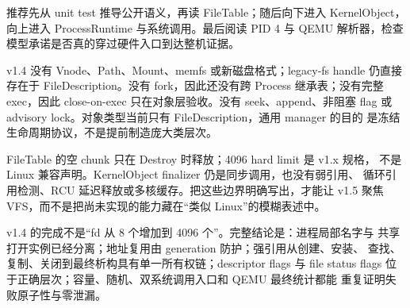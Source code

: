 推荐先从 unit test 推导公开语义，再读 FileTable；随后向下进入
KernelObject，向上进入 ProcessRuntime 与系统调用。最后阅读 PID 4 与 QEMU
解析器，检查模型承诺是否真的穿过硬件入口到达整机证据。

v1.4 没有 Vnode、Path、Mount、memfs 或新磁盘格式；legacy-fs handle 仍直接
存在于 FileDescription。没有 fork，因此还没有跨 Process 继承表；没有完整
exec，因此 close-on-exec 只在对象层验收。没有 seek、append、非阻塞 flag
或 advisory lock。对象类型当前只有 FileDescription，通用 manager 的目的
是冻结生命周期协议，不是提前制造庞大类层次。

FileTable 的空 chunk 只在 Destroy 时释放；4096 hard limit 是 v1.x 规格，
不是 Linux 兼容声明。KernelObject finalizer 仍是同步调用，也没有弱引用、
循环引用检测、RCU 延迟释放或多核缓存。把这些边界明确写出，才能让 v1.5
聚焦 VFS，而不是把尚未实现的能力藏在“类似 Linux”的模糊表述中。

\begin{keyidea}
v1.4 的完成不是“fd 从 8 个增加到 4096 个”。完整结论是：进程局部名字与
共享打开实例已经分离；地址复用由 generation 防护；强引用从创建、安装、
查找、复制、关闭到最终析构具有单一所有权链；descriptor flags 与 file
status flags 位于正确层次；容量、随机、双系统调用入口和 QEMU 最终统计都能
重复证明失败原子性与零泄漏。
\end{keyidea}
